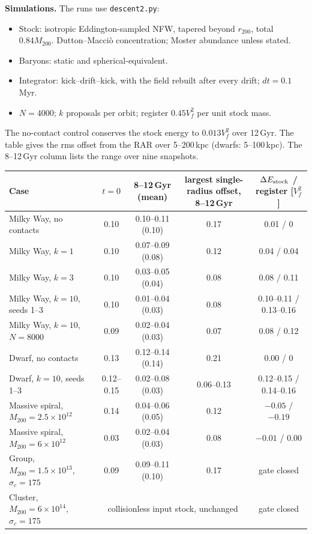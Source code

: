 \textbf{Simulations.} The runs use \texttt{descent2.py}:
\begin{itemize}
\item Stock: isotropic Eddington-sampled NFW, tapered beyond $r_{200}$, total $0.84M_{200}$. Dutton--Macci\`o concentration; Moster abundance unless stated.
\item Baryons: static and spherical-equivalent.
\item Integrator: kick--drift--kick, with the field rebuilt after every drift; $dt=0.1$\,Myr.
\item $N=4000$; $k$ proposals per orbit; register $0.45V_f^2$ per unit stock mass.
\end{itemize}
The no-contact control conserves the stock energy to $0.013V_f^2$ over 12\,Gyr. The table gives the rms offset from the RAR over 5--200\,kpc (dwarfs: 5--100\,kpc). The 8--12\,Gyr column lists the range over nine snapshots.
\begin{center}\footnotesize\setlength{\tabcolsep}{4pt}
\begin{tabular}{lcccc}\toprule
Case & $t=0$ & 8--12\,Gyr (mean) & largest single-radius offset, 8--12\,Gyr & $\Delta E_{\rm stock}$ / register [$V_f^2$]\\\midrule
Milky Way, no contacts & 0.10 & 0.10--0.11 (0.10) & 0.17 & 0.01 / 0\\
Milky Way, $k=1$ & 0.10 & 0.07--0.09 (0.08) & 0.12 & 0.04 / 0.04\\
Milky Way, $k=3$ & 0.10 & 0.03--0.05 (0.04) & 0.08 & 0.08 / 0.11\\
Milky Way, $k=10$, seeds 1--3 & 0.10 & 0.01--0.04 (0.03) & 0.08 & 0.10--0.11 / 0.13--0.16\\
Milky Way, $k=10$, $N=8000$ & 0.09 & 0.02--0.04 (0.03) & 0.07 & 0.08 / 0.12\\
Dwarf, no contacts & 0.13 & 0.12--0.14 (0.14) & 0.21 & 0.00 / 0\\
Dwarf, $k=10$, seeds 1--3 & 0.12--0.15 & 0.02--0.08 (0.03) & 0.06--0.13 & 0.12--0.15 / 0.14--0.16\\
Massive spiral, $M_{200}=2.5\times10^{12}$ & 0.14 & 0.04--0.06 (0.05) & 0.12 & $-0.05$ / $-0.19$\\
Massive spiral, $M_{200}=6\times10^{12}$ & 0.03 & 0.02--0.04 (0.03) & 0.08 & $-0.01$ / $0.00$\\
\midrule
Group, $M_{200}=1.5\times10^{13}$, $\sigma_c=175$ & 0.09 & 0.09--0.11 (0.10) & 0.17 & gate closed\\
Cluster, $M_{200}=6\times10^{14}$, $\sigma_c=175$ & \multicolumn{3}{c}{collisionless input stock, unchanged} & gate closed\\
\bottomrule\end{tabular}\end{center}

